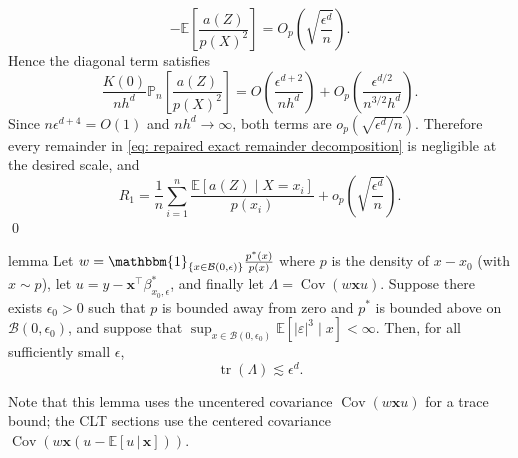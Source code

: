 \documentclass[11pt]{article}
\begin{document}
\begin{appendices}
\[    -
    \mathbb{E}\left[\frac{a(Z)}{p(X)^2}\right]
    =
    O_p\left(\sqrt{\frac{\epsilon^d}{n}}\right).
\]
Hence the diagonal term satisfies
\[
    \frac{K(0)}{nh^d}
    \mathbb{P}_n\left[\frac{a(Z)}{p(X)^2}\right]
    =
    O\left(\frac{\epsilon^{d+2}}{nh^d}\right)
    +
    O_p\left(\frac{\epsilon^{d/2}}{n^{3/2}h^d}\right).
\]
Since $n\epsilon^{d+4}=O(1)$ and $nh^d\to\infty$, both terms are
$o_p(\sqrt{\epsilon^d/n})$. Therefore every remainder in
\cref{eq: repaired exact remainder decomposition} is negligible at the desired scale, and
\[
    R_1
    =
    \frac{1}{n}\sum_{i=1}^n
    \frac{\mathbb{E}[a(Z)\mid X=x_i]}{p(x_i)}
    +
    o_p\left(\sqrt{\frac{\epsilon^d}{n}}\right).
\]
\qed{}

\begin{restatable}{lemma}{} \label{lemma: Lambda trace bound}
    Let $w = \mathbbm{1}_{\{x \in \mathcal{B}(0, \epsilon)\}}\frac{p^*(x)}{p(x)}$ where $p$ is the density of $x - x_0$ (with $x \sim p$), let $u = y - \boldsymbol{x}^{\top}\beta_{x_0, \epsilon}^*$, and finally let $\Lambda = \operatorname{Cov}(w\boldsymbol{x}u)$. Suppose there exists $\epsilon_0>0$ such that $p$ is bounded away from zero and $p^*$ is bounded above on $\mathcal{B}(0,\epsilon_0)$, and suppose that $\sup_{x\in\mathcal{B}(0,\epsilon_0)}\mathbb{E}[|\varepsilon|^3\mid x]<\infty$. Then, for all sufficiently small $\epsilon$,
    \[\operatorname{tr}\left(\Lambda\right) \lesssim \epsilon^{d}.\]
\end{restatable}
Note that this lemma uses the uncentered covariance $\operatorname{Cov}(w\boldsymbol{x}u)$ for a trace bound; the CLT sections use the centered covariance $\operatorname{Cov}(w\boldsymbol{x}(u - \mathbb{E}[u\,|\,\boldsymbol{x}]))$.


\end{appendices}
\end{document}
